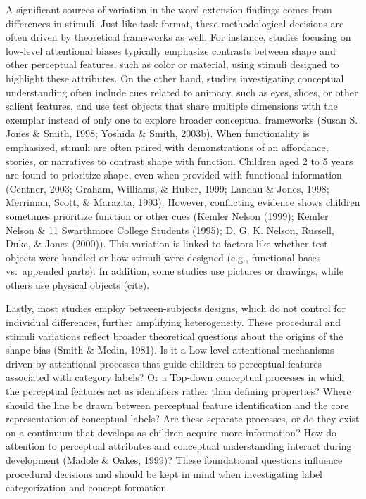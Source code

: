\documentclass[10pt, letterpaper]{article}
\begin{document}
A significant sources of variation in the word extension findings comes
from differences in stimuli. Just like task format, these methodological
decisions are often driven by theoretical frameworks as well. For
instance, studies focusing on low-level attentional biases typically
emphasize contrasts between shape and other perceptual features, such as
color or material, using stimuli designed to highlight these attributes.
On the other hand, studies investigating conceptual understanding often
include cues related to animacy, such as eyes, shoes, or other salient
features, and use test objects that share multiple dimensions with the
exemplar instead of only one to explore broader conceptual frameworks
(Susan S. Jones \& Smith, 1998; Yoshida \& Smith, 2003b). When
functionality is emphasized, stimuli are often paired with
demonstrations of an affordance, stories, or narratives to contrast
shape with function. Children aged 2 to 5 years are found to prioritize
shape, even when provided with functional information (Centner, 2003;
Graham, Williams, \& Huber, 1999; Landau \& Jones, 1998; Merriman,
Scott, \& Marazita, 1993). However, conflicting evidence shows children
sometimes prioritize function or other cues (Kemler Nelson (1999);
Kemler Nelson \& 11 Swarthmore College Students (1995); D. G. K. Nelson,
Russell, Duke, \& Jones (2000)). This variation is linked to factors
like whether test objects were handled or how stimuli were designed
(e.g., functional bases vs.~appended parts). In addition, some studies
use pictures or drawings, while others use physical objects (cite).

Lastly, most studies employ between-subjects designs, which do not
control for individual differences, further amplifying heterogeneity.
These procedural and stimuli variations reflect broader theoretical
questions about the origins of the shape bias (Smith \& Medin, 1981). Is
it a Low-level attentional mechanisms driven by attentional processes
that guide children to perceptual features associated with category
labels? Or a Top-down conceptual processes in which the perceptual
features act as identifiers rather than defining properties? Where
should the line be drawn between perceptual feature identification and
the core representation of conceptual labels? Are these separate
processes, or do they exist on a continuum that develops as children
acquire more information? How do attention to perceptual attributes and
conceptual understanding interact during development (Madole \& Oakes,
1999)? These foundational questions influence procedural decisions and
should be kept in mind when investigating label categorization and
concept formation.
\end{document}
